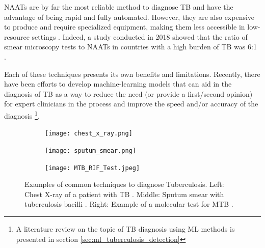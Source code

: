 \documentclass[../main.tex]{subfiles}
\begin{document}
    NAATs are by far the most reliable method to diagnose TB and have the advantage of being rapid and fully automated. However, they are also expensive to produce and require specialized equipment, making them less accessible in low-resource settings \cite{albert_development_2016, maclean_advances_2020}. Indeed, a study conducted in 2018 showed that the ratio of smear microscopy tests to NAATs in countries with a high burden of TB was 6:1 \cite{cazabon_market_2018, maclean_advances_2020}.

    Each of these techniques presents its own benefits and limitations. Recently, there have been efforts to develop machine-learning models that can aid in the diagnosis of TB as a way to reduce the need (or provide a first/second opinion) for expert clinicians in the process and improve the speed and/or accuracy of the diagnosis \footnote{A literature review on the topic of TB diagnosis using ML methods is presented in section \ref{sec:ml_tuberculosis_detection}}.

    \begin{figure}
        \begin{subfigure}{115px}
          \centering
            \texttt{[image: chest\_x\_ray.png]}
          \label{fig:chest_x_ray_example}
        \end{subfigure}%
        \begin{subfigure}{115px}
          \centering
          \texttt{[image: sputum\_smear.png]}
          \label{fig:sputum_smear_exmaple}
        \end{subfigure}
        \begin{subfigure}{115px}
          \centering
          \texttt{[image: MTB\_RIF\_Test.jpeg]}
          \label{fig:molecular_test_example}
        \end{subfigure}
        \caption{
            Examples of common techniques to diagnose Tuberculosis.
            Left: Chest X-ray of a patient with TB \cite{ubaidi_radiological_nodate}. Middle: Sputum smear with tuberculosis bacilli \cite{shah_ziehlneelsen_2017}. Right: Example of a molecular test for MTB \cite{boehme_rapid_2010}.
        }
        \label{fig:tuberculosis_diagnosis_examples}
    \end{figure}
    
\end{document}
